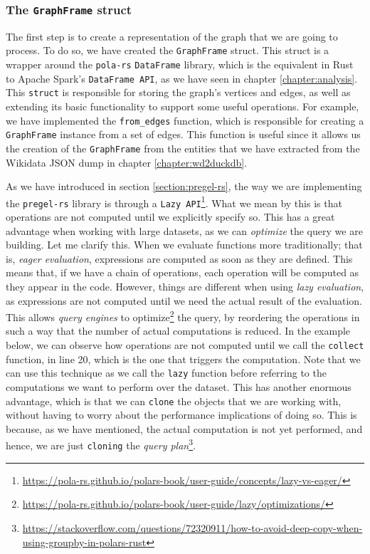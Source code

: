 \subsubsection{The \texttt{GraphFrame} struct}

The first step is to create a representation of the graph that we are going to process. To do so, we have created the \texttt{GraphFrame} struct. This struct is a wrapper around the \texttt{pola-rs} \texttt{DataFrame} library, which is the equivalent in Rust to Apache Spark's \texttt{DataFrame API}, as we have seen in chapter \ref{chapter:analysis}. This \texttt{struct} is responsible for storing the graph's vertices and edges, as well as extending its basic functionality to support some useful operations. For example, we have implemented the \texttt{from\_edges} function, which is responsible for creating a \texttt{GraphFrame} instance from a set of edges. This function is useful since it allows us the creation of the \texttt{GraphFrame} from the entities that we have extracted from the Wikidata JSON dump in chapter \ref{chapter:wd2duckdb}.

As we have introduced in section \ref{section:pregel-rs}, the way we are implementing the \texttt{pregel-rs} library is through a \texttt{Lazy API}\footnote{\url{https://pola-rs.github.io/polars-book/user-guide/concepts/lazy-vs-eager/}}. What we mean by this is that operations are not computed until we explicitly specify so. This has a great advantage when working with large datasets, as we can \textit{optimize} the query we are building. Let me clarify this. When we evaluate functions more traditionally; that is, \textit{eager evaluation}, expressions are computed as soon as they are defined. This means that, if we have a chain of operations, each operation will be computed as they appear in the code. However, things are different when using \textit{lazy evaluation}, as expressions are not computed until we need the actual result of the evaluation. This allows \textit{query engines} to optimize\footnote{\url{https://pola-rs.github.io/polars-book/user-guide/lazy/optimizations/}} the query, by reordering the operations in such a way that the number of actual computations is reduced. In the example below, we can observe how operations are not computed until we call the \texttt{collect} function, in line 20, which is the one that triggers the computation. Note that we can use this technique as we call the \texttt{lazy} function before referring to the computations we want to perform over the dataset. This has another enormous advantage, which is that we can \texttt{clone} the objects that we are working with, without having to worry about the performance implications of doing so. This is because, as we have mentioned, the actual computation is not yet performed, and hence, we are just \texttt{cloning} the \textit{query plan}\footnote{\url{https://stackoverflow.com/questions/72320911/how-to-avoid-deep-copy-when-using-groupby-in-polars-rust}}.

